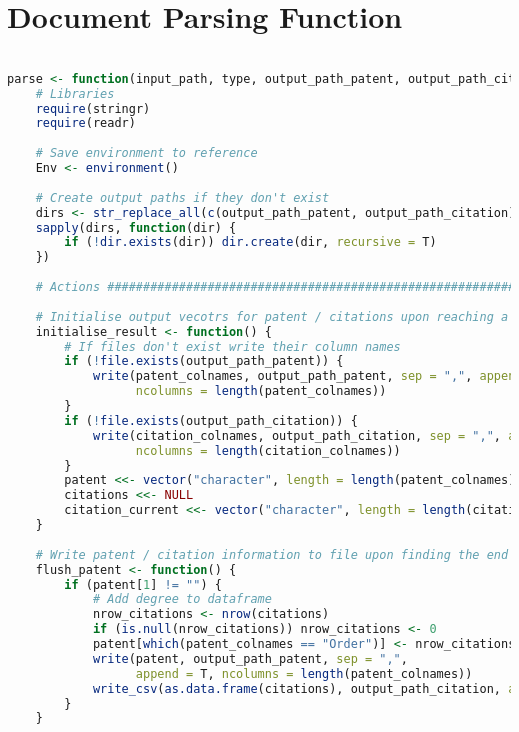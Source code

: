 
\chapter{Document Parsing Function} %

\label{AppendixA} %
\tiny
\begin{lstlisting}[language=R]

parse <- function(input_path, type, output_path_patent, output_path_citation) {
    # Libraries 
    require(stringr)
    require(readr)
    
    # Save environment to reference
    Env <- environment()
    
    # Create output paths if they don't exist
    dirs <- str_replace_all(c(output_path_patent, output_path_citation), "/.+.csv$", "")
    sapply(dirs, function(dir) {
        if (!dir.exists(dir)) dir.create(dir, recursive = T)
    })
    
    # Actions ##########################################################
    
    # Initialise output vecotrs for patent / citations upon reaching a new patent
    initialise_result <- function() {
        # If files don't exist write their column names
        if (!file.exists(output_path_patent)) {
            write(patent_colnames, output_path_patent, sep = ",", append = F, 
                  ncolumns = length(patent_colnames))
        }
        if (!file.exists(output_path_citation)) {
            write(citation_colnames, output_path_citation, sep = ",", append = F, 
                  ncolumns = length(citation_colnames))
        }
        patent <<- vector("character", length = length(patent_colnames))
        citations <<- NULL
        citation_current <<- vector("character", length = length(citation_colnames) - 1)
    }
    
    # Write patent / citation information to file upon finding the end of the current patent
    flush_patent <- function() {
        if (patent[1] != "") {
            # Add degree to dataframe
            nrow_citations <- nrow(citations)
            if (is.null(nrow_citations)) nrow_citations <- 0
            patent[which(patent_colnames == "Order")] <- nrow_citations
            write(patent, output_path_patent, sep = ",", 
                  append = T, ncolumns = length(patent_colnames))
            write_csv(as.data.frame(citations), output_path_citation, append = T)
        }
    }
    

\end{lstlisting}
